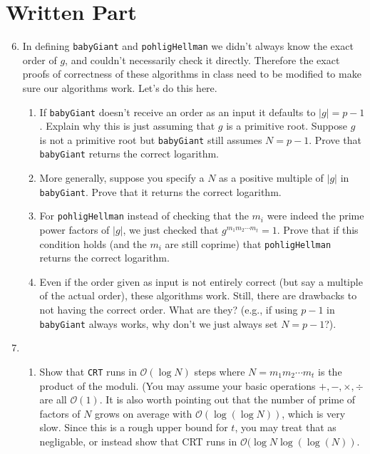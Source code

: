 \documentclass[11pt]{article}
\newcommand{\cO}{\mathcal{O}}
\begin{document}
\section*{Written Part}
\begin{enumerate}
  \setcounter{enumi}{5}
  \item{
  In defining \verb|babyGiant| and \verb|pohligHellman| we didn't always know the exact order of $g$, and couldn't necessarily check it directly.  Therefore the exact proofs of correctness of these algorithms in class need to be modified to make sure our algorithms work.  Let's do this here.
  \begin{enumerate}
    \item{
    If \verb|babyGiant| doesn't receive an order as an input it defaults to $|g| = p-1$.  Explain why this is just assuming that $g$ is a primitive root.  Suppose $g$ is not a primitive root but \verb|babyGiant| still assumes $N=p-1$.  Prove that \verb|babyGiant| returns the correct logarithm.
    }
    \item{
    More generally, suppose you specify a $N$ as a positive multiple of $|g|$ in \verb|babyGiant|.  Prove that it returns the correct logarithm.
    }
    \item{
    For \verb|pohligHellman| instead of checking that the $m_i$ were indeed the prime power factors of $|g|$, we just checked that $g^{m_1m_2\cdots m_t} = 1$.  Prove that if this condition holds (and the $m_i$ are still coprime) that \verb|pohligHellman| returns the correct logarithm.
    }
    \item{
    Even if the order given as input is not entirely correct (but say a multiple of the actual order), these algorithms work.  Still, there are drawbacks to not having the correct order.  What are they?  (e.g., if using $p-1$ in \verb|babyGiant| always works, why don't we just always set $N=p-1$?).
    }
  \end{enumerate}
  }
  \item{
  \begin{enumerate}
    \item{
    Show that \verb|CRT| runs in $\cO(\log N)$ steps where $N = m_1m_2\cdots m_t$ is the product of the moduli.  (You may assume your basic operations $+,-,\times,\div$ are all $\cO(1)$.  It is also worth pointing out that the number of prime of factors of $N$ grows on average with $\cO(\log(\log N))$, which is very slow.  Since this is a rough upper bound for $t$, you may treat that as negligable, or instead show that CRT runs in $\cO(\log N\log(\log(N))$.
}
\end{enumerate}}
\end{enumerate}
\end{document}
